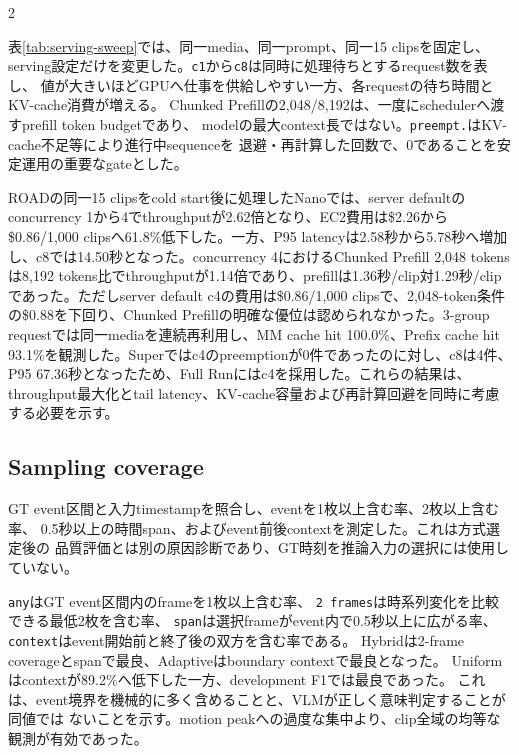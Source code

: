\documentclass[9pt,a4paper]{extarticle}
\begin{document}
\begin{multicols}{2}

表\ref{tab:serving-sweep}では、同一media、同一prompt、同一15 clipsを固定し、
serving設定だけを変更した。\texttt{c1}から\texttt{c8}は同時に処理待ちとするrequest数を表し、
値が大きいほどGPUへ仕事を供給しやすい一方、各requestの待ち時間とKV-cache消費が増える。
Chunked Prefillの2,048/8,192は、一度にschedulerへ渡すprefill token budgetであり、
modelの最大context長ではない。\texttt{preempt.}はKV-cache不足等により進行中sequenceを
退避・再計算した回数で、0であることを安定運用の重要なgateとした。

ROADの同一15 clipsをcold start後に処理したNanoでは、server defaultのconcurrency 1から4でthroughputが2.62倍となり、EC2費用は\$2.26から\$0.86/1,000 clipsへ61.8\%低下した。一方、P95 latencyは2.58秒から5.78秒へ増加し、c8では14.50秒となった。concurrency 4におけるChunked Prefill 2,048 tokensは8,192 tokens比でthroughputが1.14倍であり、prefillは1.36秒/clip対1.29秒/clipであった。ただしserver default c4の費用は\$0.86/1,000 clipsで、2,048-token条件の\$0.88を下回り、Chunked Prefillの明確な優位は認められなかった。3-group requestでは同一mediaを連続再利用し、MM cache hit 100.0\%、Prefix cache hit 93.1\%を観測した。Superではc4のpreemptionが0件であったのに対し、c8は4件、P95 67.36秒となったため、Full Runにはc4を採用した。これらの結果は、throughput最大化とtail latency、KV-cache容量および再計算回避を同時に考慮する必要を示す。

\subsection{Sampling coverage}
GT event区間と入力timestampを照合し、eventを1枚以上含む率、2枚以上含む率、
0.5秒以上の時間span、およびevent前後contextを測定した。これは方式選定後の
品質評価とは別の原因診断であり、GT時刻を推論入力の選択には使用していない。
\begin{center}
\label{tab:sampling-coverage}
\scriptsize
{}
\end{center}
\texttt{any}はGT event区間内のframeを1枚以上含む率、
\texttt{2 frames}は時系列変化を比較できる最低2枚を含む率、
\texttt{span}は選択frameがevent内で0.5秒以上に広がる率、
\texttt{context}はevent開始前と終了後の双方を含む率である。
Hybridは2-frame coverageとspanで最良、Adaptiveはboundary contextで最良となった。
Uniformはcontextが89.2\%へ低下した一方、development F1では最良であった。
これは、event境界を機械的に多く含めることと、VLMが正しく意味判定することが同値では
ないことを示す。motion peakへの過度な集中より、clip全域の均等な観測が有効であった。


\end{multicols}
\end{document}
